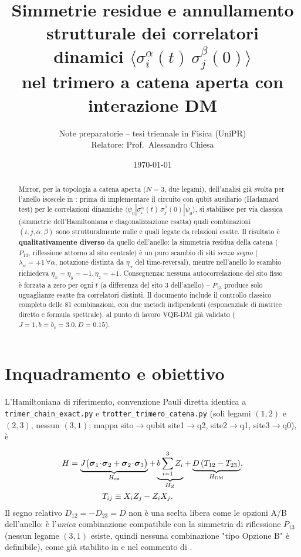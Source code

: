 \documentclass[11pt,a4paper]{article}
\title{Simmetrie residue e annullamento strutturale dei correlatori\\
dinamici $\langle\sigma_i^\alpha(t)\,\sigma_j^\beta(0)\rangle$\\[2pt]
\large nel trimero a catena aperta con interazione DM}
\author{Note preparatorie -- tesi triennale in Fisica (UniPR)\\
Relatore: Prof.\ Alessandro Chiesa}
\date{\today}
\begin{document}
\maketitle

\begin{abstract}
\noindent
Mirror, per la topologia a catena aperta ($N=3$, due legami), dell'analisi già svolta per
l'anello isoscele in \texttt{}: prima di
implementare il circuito con qubit ausiliario (Hadamard test) per le correlazioni dinamiche
$\langle\psi_0|\sigma_i^\alpha(t)\,\sigma_j^\beta(0)|\psi_0\rangle$, si stabilisce per via
classica (simmetrie dell'Hamiltoniana e diagonalizzazione esatta) quali combinazioni
$(i,j,\alpha,\beta)$ sono strutturalmente nulle e quali legate da relazioni esatte. Il risultato è
\textbf{qualitativamente diverso} da quello dell'anello: la simmetria residua della catena
($P_{13}$, riflessione attorno al sito centrale) è un puro scambio di siti \emph{senza segno}
($\lambda_\alpha=+1\ \forall\alpha$, notazione distinta da $\eta_\alpha$ del time-reversal),
mentre nell'anello lo scambio richiedeva $\eta_x=\eta_y=-1,\eta_z=+1$. Conseguenza: nessuna autocorrelazione del sito fisso è forzata a
zero per ogni $t$ (a differenza del sito 3 dell'anello) -- $P_{13}$ produce solo uguaglianze
esatte fra correlatori distinti. Il documento include il controllo classico completo delle 81
combinazioni, con due metodi indipendenti (esponenziale di matrice diretto e formula spettrale),
al punto di lavoro VQE-DM già validato ($J{=}1,b{=}b_c{=}3.0,D{=}0.15$).
\end{abstract}

\tableofcontents

\section{Inquadramento e obiettivo}

L'Hamiltoniana di riferimento, convenzione Pauli diretta identica a
\texttt{trimer\_chain\_exact.py} e \texttt{trotter\_trimero\_catena.py} (soli legami $(1,2)$ e
$(2,3)$, nessun $(3,1)$; mappa sito$\to$qubit site1$\to$q2, site2$\to$q1, site3$\to$q0), è

\begin{align}
H &= \underbrace{J\big(\boldsymbol\sigma_1\!\cdot\!\boldsymbol\sigma_2
  + \boldsymbol\sigma_2\!\cdot\!\boldsymbol\sigma_3\big)}_{H_{\mathrm{ex}}}
  + \underbrace{b\sum_{i=1}^3 Z_i}_{H_Z}
  + \underbrace{D\,(T_{12}-T_{23})}_{H_{\mathrm{DM}}},\notag\\
&\qquad\qquad T_{ij}\equiv X_iZ_j-Z_iX_j.
\label{eq:H}
\end{align}
Il segno relativo $D_{12}=-D_{23}=D$ non è una scelta libera come le opzioni A/B dell'anello: è
l'\emph{unica} combinazione compatibile con la simmetria di riflessione $P_{13}$ (nessun legame
$(3,1)$ esiste, quindi nessuna combinazione "tipo Opzione B" è definibile), come già stabilito in
\texttt{} e nel commento di
\texttt{}.
\end{document}
